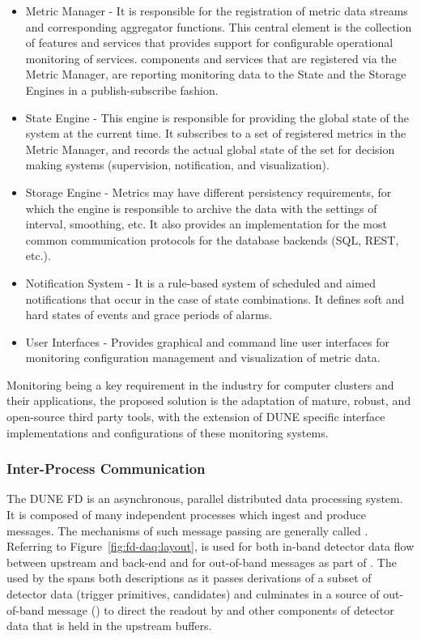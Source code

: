 \begin{itemize}
  \item Metric Manager - It is responsible for the registration of metric data streams and corresponding aggregator functions. This central element is the collection of features and services that provides support for configurable operational monitoring of  services.  components and services that are registered via the Metric Manager, are reporting monitoring data to the State and the Storage Engines in a publish-subscribe fashion. 
  \item State Engine - This engine is responsible for providing the global state of the system at the current time. It subscribes to a set of registered metrics in the Metric Manager, and records the actual global state of the set for decision making systems (supervision, notification, and visualization).
  \item Storage Engine - Metrics may have different persistency requirements, for which the engine is responsible to archive the data with the settings of interval, smoothing, etc. It also provides an implementation for the most common communication protocols for the database backends (SQL, REST, etc.).
  \item Notification System - It is a rule-based system of scheduled and aimed notifications that occur in the case of state combinations. It defines soft and hard states of events and grace periods of alarms.
  \item User Interfaces - Provides graphical and command line user interfaces for monitoring configuration management and visualization of metric data.
\end{itemize}

Monitoring being a key requirement in the industry for computer clusters and their applications, the proposed solution is the adaptation of mature, robust, and open-source third party tools, with the extension of DUNE  specific interface implementations and configurations of these monitoring systems. 


\subsubsection{Inter-Process Communication}
\label{sec:daq:design-ipc}

The DUNE FD  is an asynchronous, parallel distributed data processing system. 
It is composed of many independent processes which ingest and produce messages. 
The mechanisms of such message passing are generally called . 
Referring to Figure~\ref{fig:fd-daq:layout},  is used for both in-band detector data flow between upstream  and back-end  and for out-of-band messages as part of .  The  used by the  spans both descriptions as it passes derivations of a subset of detector data (trigger primitives, candidates) and culminates in a source of out-of-band message () to direct the readout by  and other components of detector data that is held in the upstream  buffers.

